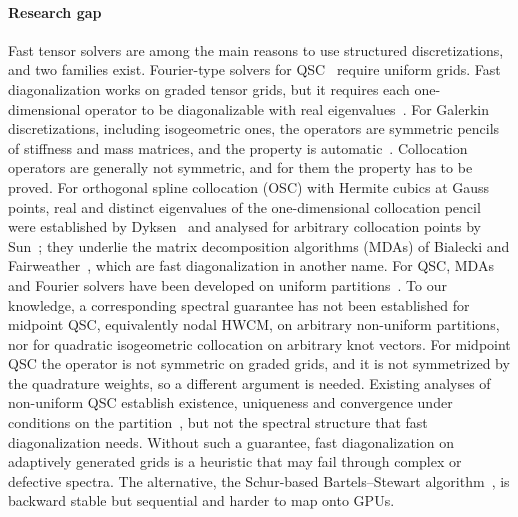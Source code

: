 \documentclass[preprint,12pt]{elsarticle}
\theoremstyle{remark}
\begin{document}
\paragraph{Research gap}
Fast tensor solvers are among the main reasons to use structured discretizations, and two families
exist. Fourier-type solvers for QSC~\cite{christara2002fast} require uniform grids. Fast diagonalization
works on graded tensor grids, but it requires each one-dimensional operator to be diagonalizable with
real eigenvalues~\cite{lynch1964direct}. For Galerkin discretizations, including isogeometric ones, the
operators are symmetric pencils of stiffness and mass matrices, and the property is
automatic~\cite{sangalli2016isogeometric}. Collocation operators are generally not symmetric, and for them the property has to be proved. For
orthogonal spline collocation (OSC) with Hermite cubics at Gauss points, real and distinct eigenvalues of
the one-dimensional collocation pencil were established by Dyksen~\cite{dyksen1987tensor} and analysed for
arbitrary collocation points by Sun~\cite{sun1999spectral}; they underlie the matrix decomposition
algorithms (MDAs) of Bialecki and Fairweather~\cite{bialecki1995matrix,bialecki2011matrix}, which are fast
diagonalization in another name. For QSC, MDAs and Fourier solvers have been developed on uniform
partitions~\cite{christara2002fast,bialecki2011matrix}. To our knowledge, a corresponding spectral guarantee
has not been established for midpoint QSC, equivalently nodal HWCM, on arbitrary non-uniform partitions,
nor for quadratic isogeometric collocation on arbitrary knot vectors. For midpoint QSC the operator is not
symmetric on graded grids, and it is not symmetrized by the quadrature weights, so a different argument is
needed. Existing analyses of non-uniform
QSC establish existence, uniqueness and convergence under conditions on the
partition~\cite{christara2006optimal}, but not the spectral structure that fast diagonalization needs.
Without such a guarantee, fast diagonalization on adaptively generated grids is a heuristic that may
fail through complex or defective spectra. The alternative, the Schur-based Bartels--Stewart
algorithm~\cite{bartels1972solution}, is backward stable but sequential and harder to map onto GPUs.
\end{document}
